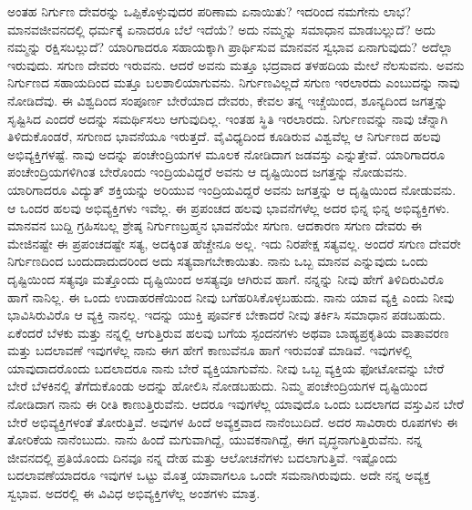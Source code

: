 ಅಂತಹ ನಿರ್ಗುಣ ದೇವರನ್ನು ಒಪ್ಪಿಕೊಳ್ಳುವುದರ ಪರಿಣಾಮ ಏನಾಯಿತು? ಇದರಿಂದ ನಮಗೇನು ಲಾಭ? ಮಾನವಜೀವನದಲ್ಲಿ ಧರ್ಮಕ್ಕೆ ಏನಾದರೂ ಬೆಲೆ ಇದೆಯೆ? ಅದು ನಮ್ಮನ್ನು ಸಮಾಧಾನ ಮಾಡಬಲ್ಲುದೆ? ಅದು ನಮ್ಮನ್ನು ರಕ್ಷಿಸಬಲ್ಲುದೆ? ಯಾರಿಗಾದರೂ ಸಹಾಯಕ್ಕಾಗಿ ಪ್ರಾರ್ಥಿಸುವ ಮಾನವನ ಸ್ವಭಾವ ಏನಾಗುವುದು? ಅದೆಲ್ಲಾ ಇರುವುದು. ಸಗುಣ ದೇವರು ಇರುವನು. ಆದರೆ ಅವನು ಮತ್ತೂ ಭದ್ರವಾದ ತಳಹದಿಯ ಮೇಲೆ ನೆಲಸುವನು. ಅವನು ನಿರ್ಗುಣದ ಸಹಾಯದಿಂದ ಮತ್ತೂ ಬಲಶಾಲಿಯಾಗುವನು. ನಿರ್ಗುಣವಿಲ್ಲದೆ ಸಗುಣ ಇರಲಾರದು ಎಂಬುದನ್ನು ನಾವು ನೋಡಿದೆವು. ಈ ವಿಶ್ವದಿಂದ ಸಂಪೂರ್ಣ ಬೇರೆಯಾದ ದೇವರು, ಕೇವಲ ತನ್ನ ಇಚ್ಚೆಯಿಂದ, ಶೂನ್ಯದಿಂದ ಜಗತ್ತನ್ನು ಸೃಷ್ಟಿಸಿದ ಎಂದರೆ ಅದನ್ನು ಸಮರ್ಥಿಸಲು ಆಗುವುದಿಲ್ಲ. ಇಂತಹ ಸ್ಥಿತಿ ಇರಲಾರದು. ನಿರ್ಗುಣವನ್ನು ನಾವು ಚೆನ್ನಾಗಿ ತಿಳಿದುಕೊಂಡರೆ, ಸಗುಣದ ಭಾವನೆಯೂ ಇರುತ್ತದೆ. ವೈವಿಧ್ಯದಿಂದ ಕೂಡಿರುವ ವಿಶ್ವವೆಲ್ಲ ಆ ನಿರ್ಗುಣದ ಹಲವು ಅಭಿವ್ಯಕ್ತಿಗಳಷ್ಟೆ. ನಾವು ಅದನ್ನು ಪಂಚೇಂದ್ರಿಯಗಳ ಮೂಲಕ ನೋಡಿದಾಗ ಜಡವಸ್ತು ಎನ್ನುತ್ತೇವೆ. ಯಾರಿಗಾದರೂ ಪಂಚೇಂದ್ರಿಯಗಳಿಗಿಂತ ಬೇರೊಂದು ಇಂದ್ರಿಯವಿದ್ದರೆ ಅವನು ಆ ದೃಷ್ಟಿಯಿಂದ ಜಗತ್ತನ್ನು ನೋಡುವನು. ಯಾರಿಗಾದರೂ ವಿದ್ಯುತ್ ಶಕ್ತಿಯನ್ನು ಅರಿಯುವ ಇಂದ್ರಿಯವಿದ್ದರೆ ಅವನು ಜಗತ್ತನ್ನು ಆ ದೃಷ್ಟಿಯಿಂದ ನೋಡುವನು. ಆ ಒಂದರ ಹಲವು ಅಭಿವ್ಯಕ್ತಿಗಳು ಇವೆಲ್ಲ. ಈ ಪ್ರಪಂಚದ ಹಲವು ಭಾವನೆಗಳೆಲ್ಲ ಅದರ ಭಿನ್ನ ಭಿನ್ನ ಅಭಿವ್ಯಕ್ತಿಗಳು. ಮಾನವನ ಬುದ್ದಿ ಗ್ರಹಿಸಬಲ್ಲ ಶ್ರೇಷ್ಠ ನಿರ್ಗುಣಬ್ರಹ್ಮನ ಭಾವನೆಯೇ ಸಗುಣ. ಆದಕಾರಣ ಸಗುಣ ದೇವರು ಈ ಮೇಜಿನಷ್ಟೇ ಈ ಪ್ರಪಂಚದಷ್ಟೇ ಸತ್ಯ, ಅದಕ್ಕಿಂತ ಹೆಚ್ಚೇನೂ ಅಲ್ಲ. ಇದು ನಿರಪೇಕ್ಷ ಸತ್ಯವಲ್ಲ. ಅಂದರೆ ಸಗುಣ ದೇವರೇ ನಿರ್ಗುಣದಿಂದ ಬಂದುದಾದುದರಿಂದ ಅದು ಸತ್ಯವಾಗಬೇಕಾಯಿತು. ನಾನು ಒಬ್ಬ ಮಾನವ ಎನ್ನುವುದು ಒಂದು ದೃಷ್ಟಿಯಿಂದ ಸತ್ಯವೂ ಮತ್ತೊಂದು ದೃಷ್ಟಿಯಿಂದ ಅಸತ್ಯವೂ ಆಗಿರುವ ಹಾಗೆ. ನನ್ನನ್ನು ನೀವು ಹೇಗೆ ತಿಳಿದಿರುವಿರೊ ಹಾಗೆ ನಾನಿಲ್ಲ. ಈ ಒಂದು ಉದಾಹರಣೆಯಿಂದ ನೀವು ಬಗೆಹರಿಸಿಕೊಳ್ಳಬಹುದು. ನಾನು ಯಾವ ವ್ಯಕ್ತಿ ಎಂದು ನೀವು ಭಾವಿಸಿರುವಿರೊ ಆ ವ್ಯಕ್ತಿ ನಾನಲ್ಲ. ಇದನ್ನು ಯುಕ್ತಿ ಪೂರ್ವಕ ಬೇಕಾದರೆ ನೀವು ತರ್ಕಿಸಿ ಸಮಾಧಾನ ಪಡಬಹುದು. ಏಕೆಂದರೆ ಬೆಳಕು ಮತ್ತು ನನ್ನಲ್ಲಿ ಆಗುತ್ತಿರುವ ಹಲವು ಬಗೆಯ ಸ್ಪಂದನಗಳು ಅಥವಾ ಬಾಹ್ಯಪ್ರಕೃತಿಯ ವಾತಾವರಣ ಮತ್ತು ಬದಲಾವಣೆ ಇವುಗಳೆಲ್ಲ ನಾನು ಈಗ ಹೇಗೆ ಕಾಣುವೆನೂ ಹಾಗೆ ಇರುವಂತೆ ಮಾಡಿವೆ. ಇವುಗಳಲ್ಲಿ ಯಾವುದಾದರೊಂದು ಬದಲಾದರೂ ನಾನು ಬೇರೆ ವ್ಯಕ್ತಿಯಾಗುವೆನು. ನೀವು ಒಬ್ಬ ವ್ಯಕ್ತಿಯ ಫೋಟೋವನ್ನು ಬೇರೆ ಬೇರೆ ಬೆಳಕಿನಲ್ಲಿ ತೆಗೆದುಕೊಂಡು ಅದನ್ನು ಹೋಲಿಸಿ ನೋಡಬಹುದು. ನಿಮ್ಮ ಪಂಚೇಂದ್ರಿಯಗಳ ದೃಷ್ಟಿಯಿಂದ ನೋಡಿದಾಗ ನಾನು ಈ ರೀತಿ ಕಾಣುತ್ತಿರುವೆನು. ಆದರೂ ಇವುಗಳೆಲ್ಲ ಯಾವುದೊ ಒಂದು ಬದಲಾಗದ ವಸ್ತುವಿನ ಬೇರೆ ಬೇರೆ ಅಭಿವ್ಯಕ್ತಿಗಳಂತೆ ತೋರುತ್ತಿವೆ. ಅವುಗಳ ಹಿಂದೆ ಅವ್ಯಕ್ತವಾದ ನಾನೆಂಬುದಿದೆ. ಅದರ ಸಾವಿರಾರು ರೂಪಗಳು ಈ ತೋರಿಕೆಯ ನಾನೆಂಬುದು. ನಾನು ಹಿಂದೆ ಮಗುವಾಗಿದ್ದೆ, ಯುವಕನಾಗಿದ್ದೆ, ಈಗ ವೃದ್ಧನಾಗುತ್ತಿರುವೆನು. ನನ್ನ ಜೀವನದಲ್ಲಿ ಪ್ರತಿಯೊಂದು ದಿನವೂ ನನ್ನ ದೇಹ ಮತ್ತು ಆಲೋಚನೆಗಳು ಬದಲಾಗುತ್ತಿವೆ. ಇಷ್ಟೊಂದು ಬದಲಾವಣೆಯಾದರೂ ಇವುಗಳ ಒಟ್ಟು ಮೊತ್ತ ಯಾವಾಗಲೂ ಒಂದೇ ಸಮನಾಗಿರುವುದು. ಅದೇ ನನ್ನ ಅವ್ಯಕ್ತ ಸ್ವಭಾವ. ಅದರಲ್ಲಿ ಈ ವಿವಿಧ ಅಭಿವ್ಯಕ್ತಿಗಳೆಲ್ಲ ಅಂಶಗಳು ಮಾತ್ರ.

